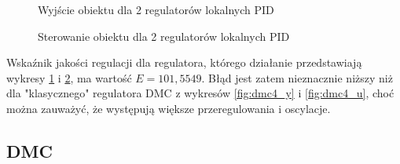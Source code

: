 \begin{figure}[H]
\centering
{}
\caption{Wyjście obiektu dla 2 regulatorów lokalnych PID}
\label{fig:2_reg_pid_y}
\end{figure}

\begin{figure}[H]
\centering
{}
\caption{Sterowanie obiektu dla 2 regulatorów lokalnych PID}
\label{fig:2_reg_pid_u}
\end{figure}

Wskaźnik jakości regulacji dla regulatora, którego działanie przedstawiają wykresy \ref{fig:2_reg_pid_y} i \ref{fig:2_reg_pid_u}, ma wartość $E=101,5549$. Błąd jest zatem nieznacznie niższy niż dla "klasycznego" regulatora DMC z wykresów \ref{fig:dmc4_y} i \ref{fig:dmc4_u}, choć można zauważyć, że występują większe przeregulowania i oscylacje.

\subsection{DMC}